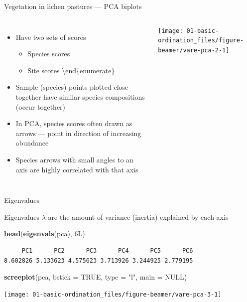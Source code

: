 \documentclass[10pt,ignorenonframetext,compress, aspectratio=169]{beamer}
\newenvironment{Shaded}{\begin{snugshade}}{\end{snugshade}}
\newcommand{\KeywordTok}[1]{\textcolor[rgb]{0.13,0.29,0.53}{\textbf{{#1}}}}
\newcommand{\DataTypeTok}[1]{\textcolor[rgb]{0.13,0.29,0.53}{{#1}}}
\newcommand{\StringTok}[1]{\textcolor[rgb]{0.31,0.60,0.02}{{#1}}}
\newcommand{\OtherTok}[1]{\textcolor[rgb]{0.56,0.35,0.01}{{#1}}}
\newcommand{\NormalTok}[1]{{#1}}
\providecommand{\tightlist}{%
  \setlength{\itemsep}{0pt}\setlength{\parskip}{0pt}}
\newcommand{\columnsbegin}{\begin{columns}}
\newcommand{\columnsend}{\end{columns}}
\begin{document}
\begin{frame}{Vegetation in lichen pastures --- PCA biplots}

\columnsbegin
{}

\begin{itemize}
\tightlist
\item
  Have two sets of scores

  \begin{itemize}
  \tightlist
  \item
    Species scores
  \item
    Site scores \textbackslash{}end\{enumerate\}
  \end{itemize}
\item
  Sample (species) points plotted close together have similar species
  compositions (occur together)
\item
  In PCA, species scores often drawn as arrows --- point in direction of
  increasing abundance
\item
  Species arrows with small angles to an axis are highly correlated with
  that axis
\end{itemize}


\begin{center}\texttt{[image: 01-basic-ordination\_files/figure-beamer/vare-pca-2-1]} \end{center}

\columnsend

\end{frame}

\begin{frame}[fragile]{Eigenvalues}

Eigenvalues \(\lambda\) are the amount of variance (inertia) explained
by each axis

\begin{Shaded}
\begin{Highlighting}[]
\KeywordTok{head}\NormalTok{(}\KeywordTok{eigenvals}\NormalTok{(pca), 6L)}
\end{Highlighting}
\end{Shaded}

\begin{verbatim}
     PC1      PC2      PC3      PC4      PC5      PC6 
8.602826 5.133623 4.575623 3.713926 3.244925 2.779195 
\end{verbatim}

\begin{Shaded}
\begin{Highlighting}[]
\KeywordTok{screeplot}\NormalTok{(pca, }\DataTypeTok{bstick =} \OtherTok{TRUE}\NormalTok{, }\DataTypeTok{type =} \StringTok{"l"}\NormalTok{, }\DataTypeTok{main =} \OtherTok{NULL}\NormalTok{)}
\end{Highlighting}
\end{Shaded}

\begin{center}\texttt{[image: 01-basic-ordination\_files/figure-beamer/vare-pca-3-1]} \end{center}

\end{frame}
\end{document}
